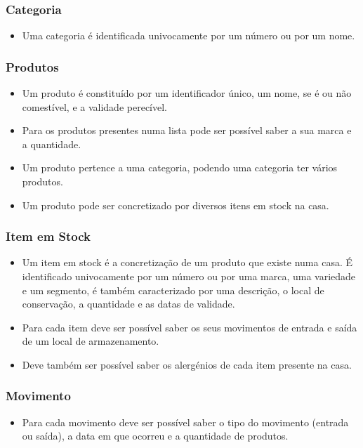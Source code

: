 \subsubsection{Categoria}
\begin{itemize}
	\item Uma categoria é identificada univocamente por um número ou por um nome.
\end{itemize}


\subsubsection{Produtos}
\begin{itemize}
	\item Um produto é constituído por um identificador único, um nome, se é ou não comestível, e a validade perecível.
	\item Para os produtos presentes numa lista pode ser possível saber a sua marca e a quantidade.
	\item Um produto pertence a uma categoria, podendo uma categoria ter vários produtos.
	\item Um produto pode ser concretizado por diversos itens em stock na casa.
\end{itemize}
 
\subsubsection{Item em Stock}
\begin{itemize}
	\item Um item em stock é a concretização de um produto que existe numa casa. É identificado univocamente por um número ou por uma marca, uma variedade e um segmento, é também caracterizado por uma descrição, o local de conservação, a quantidade e as datas de validade. 
	\item Para cada item deve ser possível saber os seus movimentos de entrada e saída de um local de armazenamento.
	\item Deve também ser possível saber os alergénios de cada item presente na casa.
\end{itemize}

\subsubsection{Movimento}
\begin{itemize}
	\item Para cada movimento deve ser possível saber o tipo do movimento (entrada ou saída), a data em que ocorreu e a quantidade de produtos. 
\end{itemize}

